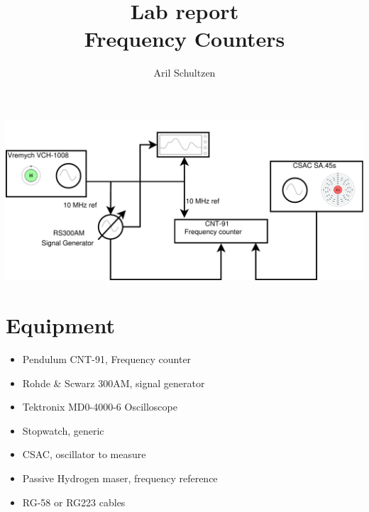 \documentclass[11pt,english,a4paper]{article}
\title{Lab report \\ Frequency Counters}
\author{Aril Schultzen}
\begin{document}
\maketitle
\includegraphics[width=1 \textwidth]{lab_report_diagram.pdf}

\section{Equipment}
\begin{itemize}
  \item Pendulum CNT-91, Frequency counter
  \item Rohde \& Scwarz 300AM, signal generator
  \item Tektronix MD0-4000-6 Oscilloscope
  \item Stopwatch, generic
  \item CSAC, oscillator to measure
  \item Passive Hydrogen maser, frequency reference
  \item RG-58 or RG223 cables
\end{itemize}
\end{document}
